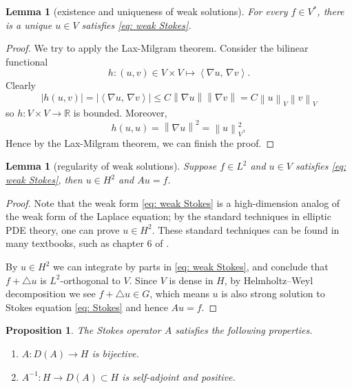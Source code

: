 \documentclass[a4paper, 12pt, oneside]{amsart}
\newtheorem{lemma}[theorem]{Lemma}
\newtheorem{proposition}[theorem]{Proposition}
\theoremstyle{definition}
\theoremstyle{remark}
\newcommand{\abs}[1]{\left\lvert #1 \right\rvert}
\newcommand{\norm}[1]{\left\lVert #1 \right\rVert}
\newcommand{\bk}[2]{\left\langle #1,\, #2 \right\rangle}
\renewcommand{\leq}{\leqslant}
\newcommand{\laplace}{\triangle}
\newcommand{\R}{\mathbb{R}}
\begin{document}
\begin{lemma}[existence and uniqueness of weak solutions]
    For every $f\in V^*$, there is a unique $u\in V$ satisfies \eqref{eq: weak Stokes}.
\end{lemma}

\begin{proof}
We try to apply the Lax-Milgram theorem. Consider the bilinear functional
\[
    h: (u, v)\in V\times V\mapsto\bk{\nabla u}{\nabla v}.
\]
Clearly
\[
    \abs{h(u, v)} = \abs{\bk{\nabla u}{\nabla v}} \leq C\norm{\nabla u}\norm{\nabla v} = C\norm{u}_V\norm{v}_V
\]
so $h: V\times V\to\R$ is bounded. Moreover,
\[
    h(u, u) = \norm{\nabla u}^2 = \norm{u}_V^2,
\]
Hence by the Lax-Milgram theorem, we can finish the proof.
\end{proof}

\begin{lemma}[regularity of weak solutions]
    \label{lemma: regularity of Stokes equations}
    Suppose $f\in L^2$ and $u\in V$ satisfies \eqref{eq: weak Stokes}, then $u\in H^2$ and $Au=f$. 
\end{lemma}

\begin{proof}
    Note that the weak form \ref{eq: weak Stokes} is a high-dimension analog of the weak form of the Laplace equation; by the standard techniques in elliptic PDE theory, one can prove $u\in H^2$. These standard techniques can be found in many textbooks, such as chapter 6 of \cite{evans2010partial}. 

    By $u\in H^2$ we can integrate by parts in \eqref{eq: weak Stokes}, and conclude that $f+\laplace u$ is $L^2$-orthogonal to $V$. Since $V$ is dense in $H$, by Helmholtz--Weyl decomposition we see $f+\laplace u\in G$, which means $u$ is also strong solution to Stokes equation \ref{eq: Stokes} and hence $Au=f$.
\end{proof}

\begin{proposition}
    The Stokes operator $A$ satisfies the following properties.
    \begin{enumerate}
        \item $A: D(A)\to H$ is bijective.
        \item $A^{-1}: H\to D(A)\subset H$ is self-adjoint and positive.
    \end{enumerate}
\end{proposition}
\end{document}
